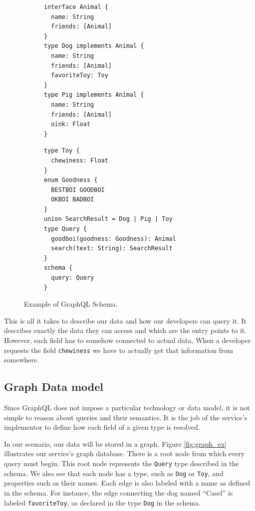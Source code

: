 \begin{figure}
    \centering
    \begin{subfigure}{.5\linewidth}
    
    \begin{verbatim}
interface Animal {		
  name: String
  friends: [Animal]
}
type Dog implements Animal {
  name: String
  friends: [Animal]
  favoriteToy: Toy
}
type Pig implements Animal {
  name: String
  friends: [Animal]
  oink: Float
}
    \end{verbatim}
    \end{subfigure}%
    \begin{subfigure}{.5\linewidth}
    \begin{verbatim}
type Toy {
  chewiness: Float
}
enum Goodness { 
  BESTBOI GOODBOI 
  OKBOI BADBOI 
}
union SearchResult = Dog | Pig | Toy
type Query {
  goodboi(goodness: Goodness): Animal
  search(text: String): SearchResult
}
schema {
  query: Query
}
    \end{verbatim}
    \end{subfigure}
    
    \caption{Example of GraphQL Schema.}
    \label{fig:schema_ex}
\end{figure}

This is all it takes to describe our data and how our developers can query it. It describes exactly the data they can access and which are the entry points to it. However, each field has to somehow connected to actual data. When a developer requests the field \texttt{chewiness} we have to actually get that information from somewhere.

\subsection*{Graph Data model}
Since GraphQL does not impose a particular technology or data model, it is not simple to reason about queries and their semantics. It is the job of the service's implementor to define how  each field of a given type is resolved.

In our scenario, our data will be stored in a graph. Figure \ref{fig:graph_ex} illustrates our service's graph database. There is a root node from which every query must begin. This root node represents the \texttt{Query} type described in the schema. We also see that each node has a type, such as \texttt{Dog} or \texttt{Toy}, and properties such as their names. Each edge is also labeled with a name as defined in the schema. For instance, the edge connecting the dog named ``Casel'' is labeled \texttt{favoriteToy}, as declared in the type \texttt{Dog} in the schema.

